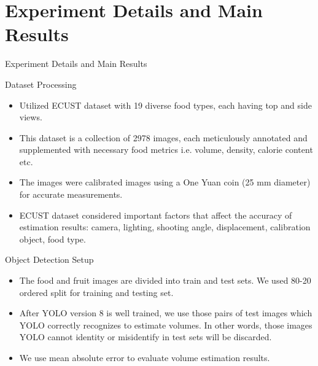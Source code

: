 \documentclass{beamer}
\begin{document}
	\section{Experiment Details and Main Results}
	\begin{frame}{Experiment Details and Main Results}
		\begin{block}{Dataset Processing}\scriptsize
			\begin{itemize}
				\item Utilized ECUST dataset with 19 diverse food types, each having top and side views.
				\item This dataset is a collection of 2978 images, each meticulously annotated and supplemented with necessary food metrics i.e. volume, density, calorie content etc.
				\item The images were calibrated images using a One Yuan coin (25 mm diameter) for accurate measurements.
				\item ECUST dataset considered important factors that affect the accuracy of estimation results: camera, lighting, shooting angle, displacement, calibration object, food type.
			\end{itemize}
		\end{block}\pause
		\begin{block}{Object Detection Setup}
			\begin{itemize}\scriptsize
				\item The food and fruit images are divided into train and test sets. We used 80-20 ordered split for training and testing set. 
				\item After YOLO version 8 is well trained, we use those pairs of test images which YOLO correctly recognizes to estimate volumes. In other words, those images YOLO cannot identity or misidentify in test sets will be discarded.
				\item We use mean absolute error to evaluate volume estimation results.
			\end{itemize}
		\end{block}
	\end{frame}
	
\end{document}

